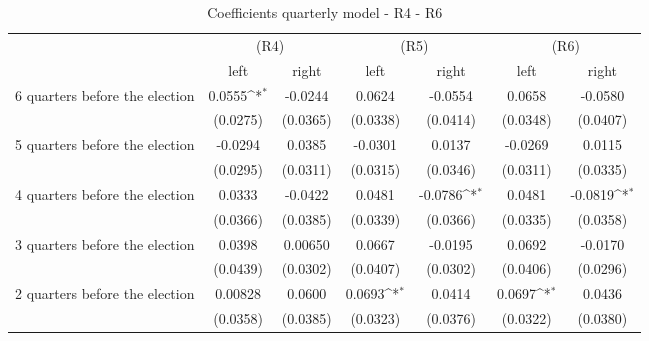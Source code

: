 \begin{table}[!ht]\centering \scriptsize
\def\sym#1{\ifmmode^{#1}\else\(^{#1}\)\fi}
\caption{Coefficients quarterly model - R4 - R6}
\begin{tabular}{l*{6}{c}}
\hline\hline
                    &\multicolumn{2}{c}{(R4)}&\multicolumn{2}{c}{(R5)}&\multicolumn{2}{c}{(R6)}\\
                    &\multicolumn{1}{c}{left}&\multicolumn{1}{c}{right}&\multicolumn{1}{c}{left}&\multicolumn{1}{c}{right}&\multicolumn{1}{c}{left}&\multicolumn{1}{c}{right}\\
\hline
 6 quarters before the election&      0.0555\sym{*}  &     -0.0244         &      0.0624         &     -0.0554         &      0.0658         &     -0.0580         \\
                    &    (0.0275)         &    (0.0365)         &    (0.0338)         &    (0.0414)         &    (0.0348)         &    (0.0407)         \\
[0,12em]
 5 quarters before the election&     -0.0294         &      0.0385         &     -0.0301         &      0.0137         &     -0.0269         &      0.0115         \\
                    &    (0.0295)         &    (0.0311)         &    (0.0315)         &    (0.0346)         &    (0.0311)         &    (0.0335)         \\
[0,12em]
 4 quarters before the election&      0.0333         &     -0.0422         &      0.0481         &     -0.0786\sym{*}  &      0.0481         &     -0.0819\sym{*}  \\
                    &    (0.0366)         &    (0.0385)         &    (0.0339)         &    (0.0366)         &    (0.0335)         &    (0.0358)         \\
[0,12em]
 3 quarters before the election&      0.0398         &     0.00650         &      0.0667         &     -0.0195         &      0.0692         &     -0.0170         \\
                    &    (0.0439)         &    (0.0302)         &    (0.0407)         &    (0.0302)         &    (0.0406)         &    (0.0296)         \\
[0,12em]
 2 quarters before the election&     0.00828         &      0.0600         &      0.0693\sym{*}  &      0.0414         &      0.0697\sym{*}  &      0.0436         \\
                    &    (0.0358)         &    (0.0385)         &    (0.0323)         &    (0.0376)         &    (0.0322)         &    (0.0380)         \\

\end{tabular}
\end{table}
